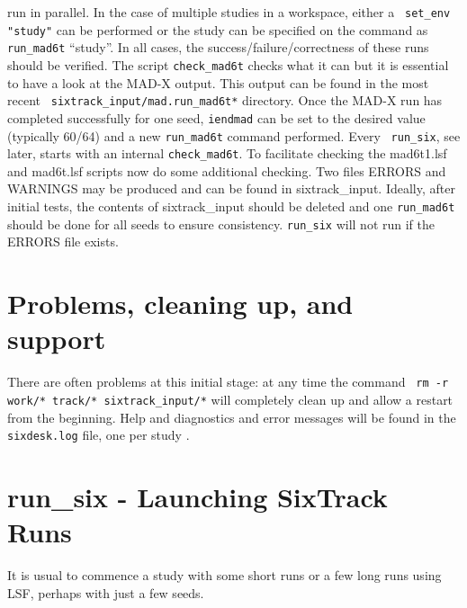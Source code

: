 \documentclass{cernatsnote}
\begin{document}
run in parallel.  In the case of multiple studies in a workspace, either a {\tt
set\_env "study"} can be performed or the study can be specified on the command
as \texttt{run\_mad6t} ``study''.
In all cases, the success/failure/correctness of these runs should be verified.
The script \texttt{check\_mad6t} checks what it can but it is essential to have a
look at the MAD-X output. This output can be found in the most recent {\tt
sixtrack\_input/mad.run\_mad6t*} directory.  Once the MAD-X run has completed
successfully for one seed, \texttt{iendmad} can be set to the desired value
(typically 60/64) and a new \texttt{run\_mad6t} command performed. Every {\tt
run\_six}, see later, starts with an internal \texttt{check\_mad6t}. To facilitate
checking the mad6t1.lsf and mad6t.lsf scripts now do some additional checking.
Two files ERRORS and WARNINGS may be produced and can be found in sixtrack\_input.
Ideally, after initial tests, the contents of sixtrack\_input should be deleted
and one \texttt{run\_mad6t} should be done for all seeds to ensure consistency. 
\texttt{run\_six} will not run if the ERRORS file exists.

\section{Problems, cleaning up, and support}

There are often problems at this initial stage: at any time the command {\tt
rm -r work/* track/* sixtrack\_input/*} will completely clean up and allow a
restart from the beginning. Help and diagnostics and error messages will be
found in the \texttt{sixdesk.log} file, one per study \footnotemark.

\section{run\_six - Launching SixTrack Runs}
%
\label{sec:run_six}
It is usual to commence a study with some short runs or a few long runs using
LSF, perhaps with just a few seeds.
\end{document}
